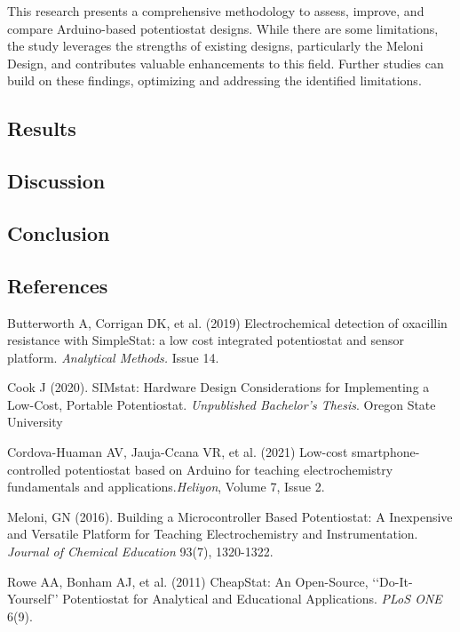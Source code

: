 \documentclass{article}
\begin{document}
This research presents a comprehensive methodology to assess, improve, and compare Arduino-based potentiostat designs. While there are some limitations, the study leverages the strengths of existing designs, particularly the Meloni Design, and contributes valuable enhancements to this field. Further studies can build on these findings, optimizing and addressing the identified limitations.

\subsection*{Results}

\subsection*{Discussion}
\subsection*{Conclusion}

\subsection*{References}
Butterworth A, Corrigan DK, et al. (2019) Electrochemical detection of oxacillin resistance with SimpleStat: a low cost integrated potentiostat and sensor platform. \emph{Analytical Methods.} Issue 14. 

Cook J (2020). SIMstat: Hardware Design Considerations for Implementing a Low-Cost, Portable Potentiostat. \emph{Unpublished Bachelor's Thesis}. Oregon State University

Cordova-Huaman AV, Jauja-Ccana VR, et al. (2021) Low-cost smartphone-controlled potentiostat based on Arduino for teaching electrochemistry fundamentals and applications.\emph{Heliyon}, Volume 7, Issue 2. 

Meloni, GN (2016). Building a Microcontroller Based Potentiostat: A Inexpensive and Versatile Platform for Teaching Electrochemistry and Instrumentation. \emph{Journal of Chemical Education} 93(7), 1320-1322. 

Rowe AA, Bonham AJ, et al. (2011) CheapStat: An Open-Source, ‘‘Do-It-Yourself’’ Potentiostat for Analytical and Educational Applications. \emph{PLoS ONE} 6(9).
\end{document}
